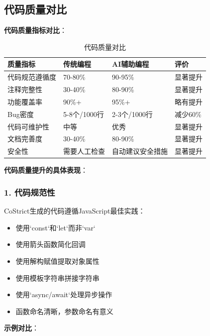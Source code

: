 ﻿\documentclass[12pt,a4paper]{article}
\begin{document}
\subsection{代码质量对比}

\textbf{代码质量指标对比}：

\begin{table}[h]
\centering
\begin{tabular}{|l|l|l|l|}
\hline
\textbf{质量指标} & \textbf{传统编程} & \textbf{AI辅助编程} & \textbf{评价} \\
\hline
代码规范遵循度 & 70-80\% & 90-95\% & 显著提升 \\
\hline
注释完整性 & 30-40\% & 80-90\% & 显著提升 \\
\hline
功能覆盖率 & 90\%+ & 95\%+ & 略有提升 \\
\hline
Bug密度 & 5-8个/1000行 & 2-3个/1000行 & 减少60\% \\
\hline
代码可维护性 & 中等 & 优秀 & 显著提升 \\
\hline
文档完善度 & 30-40\% & 80-90\% & 显著提升 \\
\hline
安全性 & 需要人工检查 & 自动建议安全措施 & 显著提升 \\
\hline
\end{tabular}
\caption{代码质量对比}
\end{table}

\textbf{代码质量提升的具体表现}：

\subsubsection{1. 代码规范性}

CoStrict生成的代码遵循JavaScript最佳实践：

\begin{itemize}
    \item 使用`const`和`let`而非`var`
    \item 使用箭头函数简化回调
    \item 使用解构赋值提取对象属性
    \item 使用模板字符串拼接字符串
    \item 使用`async/await`处理异步操作
    \item 函数命名清晰，参数命名有意义
\end{itemize}

\textbf{示例对比}：
\end{document}
